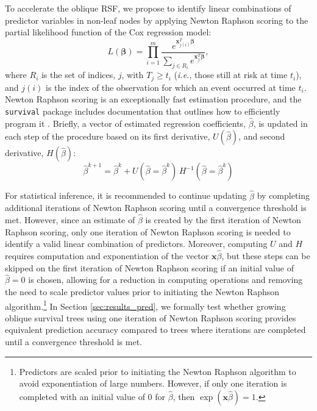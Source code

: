 \documentclass{article}\usepackage[]{graphicx}\usepackage[]{xcolor}
\newcommand{\ie}{\textit{i.e.}}
\newcommand{\secref}[1]{Section \ref{#1}}
\begin{document}
To accelerate the oblique RSF, we propose to identify linear combinations of predictor variables in non-leaf nodes by applying Newton Raphson scoring to the partial likelihood function of the Cox regression model:
\begin{equation}\label{eqn:cox-partial-likelihood}
L(\bm\beta) = \prod_{i=1}^m \frac{e^{\bm{x}_{j(i)}^T \bm\beta}}{\sum_{j \in R_i} e^{\bm{x}_j^T \bm\beta}},
\end{equation}
where $R_i$ is the set of indices, $j$, with $T_j \geq t_i$ (\ie, those still at risk at time $t_i$), and $j(i)$ is the index of the observation for which an event occurred at time $t_i$. Newton Raphson scoring is an exceptionally fast estimation procedure, and the \texttt{survival} package \citep{survival} includes documentation that outlines how to efficiently program it \citep{therneau_survival_2022}. Briefly, a vector of estimated regression coefficients, $\hat{\beta}$, is updated in each step of the procedure based on its first derivative, $U(\hat{\beta})$, and second derivative, $H(\hat{\beta})$:
$$ \hat{\beta}^{k+1} =  \hat{\beta}^{k} + U(\hat{\beta} = \hat{\beta}^{k})\, H^{-1}(\hat{\beta} = \hat{\beta}^{k}) $$

For statistical inference, it is recommended to continue updating $\hat{\beta}$ by completing additional iterations of Newton Raphson scoring until a convergence threshold is met. However, since an estimate of $\hat{\beta}$ is created by the first iteration of Newton Raphson scoring, only one iteration of Newton Raphson scoring is needed to identify a valid linear combination of predictors. Moreover, computing $U$ and $H$ requires computation and exponentiation of the vector $\bm{x}\hat{\beta}$, but these steps can be skipped on the first iteration of Newton Raphson scoring if an initial value of $\hat{\beta} = 0$ is chosen, allowing for a reduction in computing operations and removing the need to scale predictor values prior to initiating the Newton Raphson algorithm.\footnote{Predictors are scaled prior to initiating the Newton Raphson algorithm to avoid exponentiation of large numbers. However, if only one iteration is completed with an initial value of 0 for $\hat{\beta}$, then $\exp(\bm{x}\hat{\beta}) = 1$.} In \secref{sec:results_pred}, we formally test whether growing oblique survival trees using one iteration of Newton Raphson scoring provides equivalent prediction accuracy compared to trees where iterations are completed until a convergence threshold is met.
\end{document}
